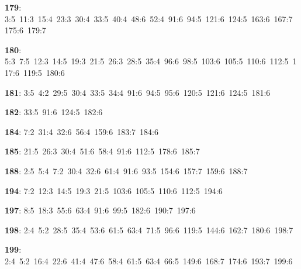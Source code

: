 \noindent \textbf{179}: 3:5\allowbreak\ 11:3\allowbreak\ 15:4\allowbreak\ 23:3\allowbreak\ 30:4\allowbreak\ 33:5\allowbreak\ 40:4\allowbreak\ 48:6\allowbreak\ 52:4\allowbreak\ 91:6\allowbreak\ 94:5\allowbreak\ 121:6\allowbreak\ 124:5\allowbreak\ 163:6\allowbreak\ 167:7\allowbreak\ 175:6\allowbreak\ 179:7\par
\noindent \textbf{180}: 5:3\allowbreak\ 7:5\allowbreak\ 12:3\allowbreak\ 14:5\allowbreak\ 19:3\allowbreak\ 21:5\allowbreak\ 26:3\allowbreak\ 28:5\allowbreak\ 35:4\allowbreak\ 96:6\allowbreak\ 98:5\allowbreak\ 103:6\allowbreak\ 105:5\allowbreak\ 110:6\allowbreak\ 112:5\allowbreak\ 117:6\allowbreak\ 119:5\allowbreak\ 180:6\par
\noindent \textbf{181}: 3:5\allowbreak\ 4:2\allowbreak\ 29:5\allowbreak\ 30:4\allowbreak\ 33:5\allowbreak\ 34:4\allowbreak\ 91:6\allowbreak\ 94:5\allowbreak\ 95:6\allowbreak\ 120:5\allowbreak\ 121:6\allowbreak\ 124:5\allowbreak\ 181:6\par
\noindent \textbf{182}: 33:5\allowbreak\ 91:6\allowbreak\ 124:5\allowbreak\ 182:6\par
\noindent \textbf{184}: 7:2\allowbreak\ 31:4\allowbreak\ 32:6\allowbreak\ 56:4\allowbreak\ 159:6\allowbreak\ 183:7\allowbreak\ 184:6\par
\noindent \textbf{185}: 21:5\allowbreak\ 26:3\allowbreak\ 30:4\allowbreak\ 51:6\allowbreak\ 58:4\allowbreak\ 91:6\allowbreak\ 112:5\allowbreak\ 178:6\allowbreak\ 185:7\par
\noindent \textbf{188}: 2:5\allowbreak\ 5:4\allowbreak\ 7:2\allowbreak\ 30:4\allowbreak\ 32:6\allowbreak\ 61:4\allowbreak\ 91:6\allowbreak\ 93:5\allowbreak\ 154:6\allowbreak\ 157:7\allowbreak\ 159:6\allowbreak\ 188:7\par
\noindent \textbf{194}: 7:2\allowbreak\ 12:3\allowbreak\ 14:5\allowbreak\ 19:3\allowbreak\ 21:5\allowbreak\ 103:6\allowbreak\ 105:5\allowbreak\ 110:6\allowbreak\ 112:5\allowbreak\ 194:6\par
\noindent \textbf{197}: 8:5\allowbreak\ 18:3\allowbreak\ 55:6\allowbreak\ 63:4\allowbreak\ 91:6\allowbreak\ 99:5\allowbreak\ 182:6\allowbreak\ 190:7\allowbreak\ 197:6\par
\noindent \textbf{198}: 2:4\allowbreak\ 5:2\allowbreak\ 28:5\allowbreak\ 35:4\allowbreak\ 53:6\allowbreak\ 61:5\allowbreak\ 63:4\allowbreak\ 71:5\allowbreak\ 96:6\allowbreak\ 119:5\allowbreak\ 144:6\allowbreak\ 162:7\allowbreak\ 180:6\allowbreak\ 198:7\par
\noindent \textbf{199}: 2:4\allowbreak\ 5:2\allowbreak\ 16:4\allowbreak\ 22:6\allowbreak\ 41:4\allowbreak\ 47:6\allowbreak\ 58:4\allowbreak\ 61:5\allowbreak\ 63:4\allowbreak\ 66:5\allowbreak\ 149:6\allowbreak\ 168:7\allowbreak\ 174:6\allowbreak\ 193:7\allowbreak\ 199:6\par
